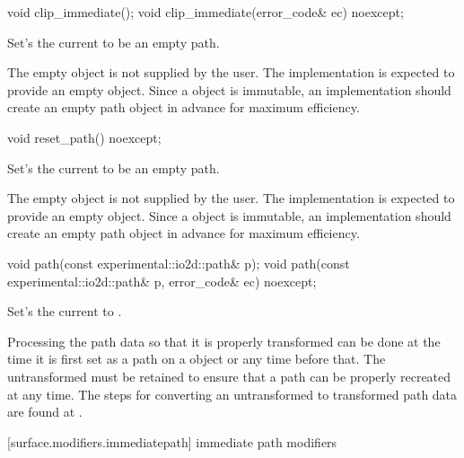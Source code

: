 \begin{itemdecl}
void clip_immediate();
void clip_immediate(error_code& ec) noexcept;
\end{itemdecl}
\begin{itemdescr}
	\pnum
	\effects
	Set's the current  to be an empty path.
	
	\pnum
	\realnotes
	The empty  object is not supplied by the user. The implementation is expected to provide an empty  object. Since a  object is immutable, an implementation should create an empty path object in advance for maximum efficiency.
\end{itemdescr}

\begin{itemdecl}
void reset_path() noexcept;
\end{itemdecl}
\begin{itemdescr}
	\pnum
	\effects
	Set's the current  to be an empty path.
	
	\pnum
	\realnotes
	The empty  object is not supplied by the user. The implementation is expected to provide an empty  object. Since a  object is immutable, an implementation should create an empty path object in advance for maximum efficiency.
\end{itemdescr}

\begin{itemdecl}
void path(const experimental::io2d::path& p);
void path(const experimental::io2d::path& p, error_code& ec) noexcept;
\end{itemdecl}
\begin{itemdescr}
	\pnum
	\effects
	Set's the current  to .
	
	\pnum
	\remarks
	Processing the path data so that it is properly transformed can be done at the time it is first set as a path on a  object or any time before that. The untransformed  must be retained to ensure that a path can be properly recreated at any time. The steps for converting an untransformed  to transformed path data are found at .
\end{itemdescr}

 [surface.modifiers.immediatepath] { immediate path modifiers}

